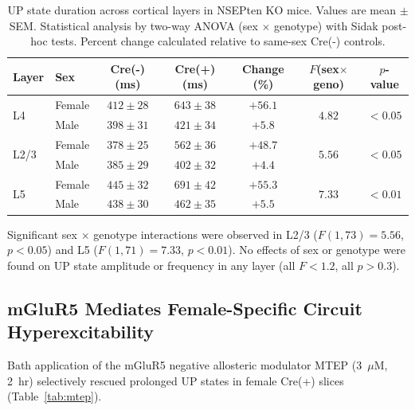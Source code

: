 \documentclass[11pt]{article}
\begin{document}
\begin{table}[H]
\centering
\caption{UP state duration across cortical layers in NSEPten KO mice. Values are mean $\pm$ SEM. Statistical analysis by two-way ANOVA (sex $\times$ genotype) with Sidak post-hoc tests. Percent change calculated relative to same-sex Cre(-) controls.}
\label{tab:upstate_duration}
\begin{tabular}{llccccc}
\toprule
\textbf{Layer} & \textbf{Sex} & \textbf{Cre(-) (ms)} & \textbf{Cre(+) (ms)} & \textbf{Change (\%)} & \textbf{$F$(sex$\times$geno)} & \textbf{$p$-value} \\
\midrule
\multirow{2}{*}{L4} & Female & $412 \pm 28$ & $643 \pm 38$ & $+56.1$ & \multirow{2}{*}{$4.82$} & \multirow{2}{*}{$< 0.05$} \\
 & Male & $398 \pm 31$ & $421 \pm 34$ & $+5.8$ & & \\
\midrule
\multirow{2}{*}{L2/3} & Female & $378 \pm 25$ & $562 \pm 36$ & $+48.7$ & \multirow{2}{*}{$5.56$} & \multirow{2}{*}{$< 0.05$} \\
 & Male & $385 \pm 29$ & $402 \pm 32$ & $+4.4$ & & \\
\midrule
\multirow{2}{*}{L5} & Female & $445 \pm 32$ & $691 \pm 42$ & $+55.3$ & \multirow{2}{*}{$7.33$} & \multirow{2}{*}{$< 0.01$} \\
 & Male & $438 \pm 30$ & $462 \pm 35$ & $+5.5$ & & \\
\bottomrule
\end{tabular}
\end{table}

Significant sex $\times$ genotype interactions were observed in L2/3 ($F(1,73) = 5.56$, $p < 0.05$) and L5 ($F(1,71) = 7.33$, $p < 0.01$). No effects of sex or genotype were found on UP state amplitude or frequency in any layer (all $F < 1.2$, all $p > 0.3$).

\subsection{mGluR5 Mediates Female-Specific Circuit Hyperexcitability}

Bath application of the mGluR5 negative allosteric modulator MTEP (3~$\mu$M, 2~hr) selectively rescued prolonged UP states in female Cre(+) slices (Table~\ref{tab:mtep}).
\end{document}
